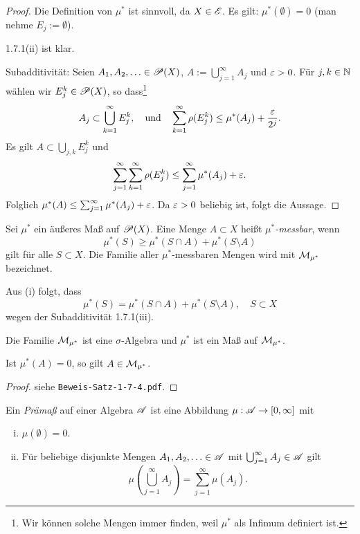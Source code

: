 \begin{proof}
 Die Definition von $\mu^*$ ist sinnvoll, da $X \in \mathscr{E}$. Es gilt: $\mu^*(\emptyset) = 0$ (man nehme $E_j := \emptyset$).
 
 1.7.1(ii) ist klar.
 
 Subadditivität: Seien $A_1, A_2, \ldots \in \mathscr{P}(X)$, $A:= \bigcup_{j=1}^\infty A_j$ und $\varepsilon > 0$. Für $j, k \in \mathbb{N}$ wählen wir $E_j^k \in \mathscr{P}(X)$, so dass\footnote{Wir können solche Mengen immer finden, weil $\mu^*$ als Infimum definiert ist.}
 \[ A_j \subset \bigcup_{k=1}^\infty E_j^k, \quad \text{und} \quad \sum_{k=1}^\infty \rho( E_j^k) \le \mu^* (A_j) + \frac{\varepsilon}{2^j}. \]
 Es gilt $A \subset \bigcup_{j,k} E_j^k$ und
 \[ \sum_{j=1}^\infty \sum_{k=1}^\infty \rho( E_j^k ) \le \sum_{j=1}^\infty \mu^*(A_j) + \varepsilon. \]
 Folglich $\mu^*(A) \le \sum_{j=1}^\infty \mu^*(A_j) + \varepsilon$. Da $\varepsilon > 0$ beliebig ist, folgt die Aussage.
\end{proof}

\begin{defn}
 Sei $\mu^*$ ein äußeres Maß auf $\mathscr{P}(X)$. Eine Menge $A \subset X$ heißt \emph{$\mu^*$-messbar}, wenn
 \[ \mu^*(S) \ge \mu^*( S \cap A ) + \mu^*( S \setminus A ) \tag{(i)} \]
 gilt für alle $S \subset X$. Die Familie aller $\mu^*$-messbaren Mengen wird mit $\mathcal{M}_{\mu^*}$ bezeichnet.
\end{defn}

\begin{rmrk*}
 Aus (i) folgt, dass
 \[ \mu^*(S) = \mu^* (S \cap A) + \mu^* ( S \setminus A ), \quad S \subset X \]
 wegen der Subadditivität 1.7.1(iii).
\end{rmrk*}

\begin{thm}[Caratheodory]
 Die Familie $\mathcal{M}_{\mu^*}$ ist eine $\sigma$-Algebra und $\mu^*$ ist ein Maß auf $\mathcal{M}_{\mu^*}$.
 
 Ist $\mu^*(A) = 0$, so gilt $A \in \mathcal{M}_{\mu^*}$.
\end{thm}

\begin{proof}
 siehe \verb+Beweis-Satz-1-7-4.pdf+.
\end{proof}

\begin{defn}
 Ein \emph{Prämaß} auf einer Algebra $\mathscr{A}$ ist eine Abbildung $\mu: \mathscr{A} \to [0, \infty]$ mit 
 \begin{enumerate}[(i)]
  \item $\mu(\emptyset) = 0$.
  \item Für beliebige disjunkte Mengen $A_1, A_2, \ldots \in \mathscr{A}$ mit $\bigcup_{j=1}^\infty A_j \in \mathscr{A}$ gilt
   \[ \mu \left( \bigcup_{j=1}^\infty A_j \right) = \sum_{j=1}^\infty \mu( A_j ). \]
 \end{enumerate}
\end{defn}


